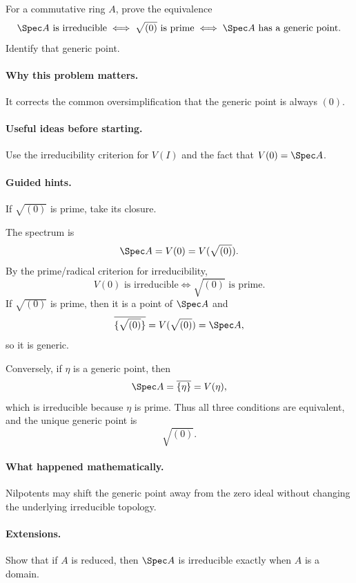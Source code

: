 \begin{problem}
For a commutative ring $A$, prove the equivalence
\[
\Spec A\text{ is irreducible}
\iff
\sqrt{(0)}\text{ is prime}
\iff
\Spec A\text{ has a generic point}.
\]
Identify that generic point.
\end{problem}

\paragraph{Why this problem matters.}
It corrects the common oversimplification that the generic point is always $(0)$.

\paragraph{Useful ideas before starting.}
Use the irreducibility criterion for $V(I)$ and the fact that $V(0)=\Spec A$.

\paragraph{Guided hints.}
If $\sqrt{(0)}$ is prime, take its closure.

\begin{solution}
The spectrum is
\[
\Spec A=V(0)=V(\sqrt{(0)}).
\]
By the prime/radical criterion for irreducibility,
\[
V(0)\text{ is irreducible}
\iff
\sqrt{(0)}\text{ is prime}.
\]
If $\sqrt{(0)}$ is prime, then it is a point of $\Spec A$ and
\[
\overline{\{\sqrt{(0)}\}}
=
V(\sqrt{(0)})
=
\Spec A,
\]
so it is generic.

Conversely, if $\eta$ is a generic point, then
\[
\Spec A=\overline{\{\eta\}}=V(\eta),
\]
which is irreducible because $\eta$ is prime.  Thus all three conditions are equivalent,
and the unique generic point is
\[
\boxed{\sqrt{(0)}}.
\]
\end{solution}

\paragraph{What happened mathematically.}
Nilpotents may shift the generic point away from the zero ideal without changing the
underlying irreducible topology.

\paragraph{Extensions.}
Show that if $A$ is reduced, then $\Spec A$ is irreducible exactly when $A$ is a domain.
